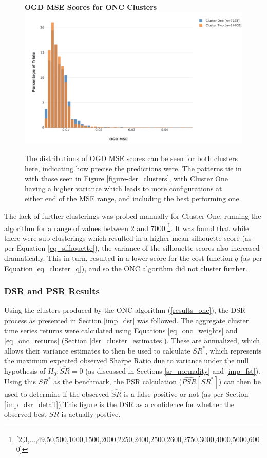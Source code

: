 \documentclass[a4paper,11pt,oneside]{article}
\theoremstyle{plain}
\theoremstyle{definition}
\begin{document}
	\begin{figure}[H]
		\centering
		\textbf{OGD MSE Scores for ONC Clusters}
		\includegraphics[scale=0.35]{images/results/dsr/cluster_distributions_mse.png} 
		\caption[OGD MSE Scores for ONC Clusters]{
			The distributions of OGD MSE scores can be seen for both clusters here, indicating how precise the predictions were. The patterns tie in with those seen in Figure \ref{figure-dsr_clusters}, with Cluster One having a higher variance which leads to more configurations at either end of the MSE range, and including the best performing one.}
		\label{figure-dsr_clusters_mse}
	\end{figure}
	
	The lack of further clusterings was probed manually for Cluster One, running the algorithm for a range of values between 2 and 7000 \footnote{[2,3,...,49,50,500,1000,1500,2000,2250,2400,2500,2600,2750,3000,4000,5000,6000]}. It was found that while there were sub-clusterings which resulted in a higher mean silhouette score (as per Equation \ref{eq_silhouette}), the variance of the silhouette scores also increased dramatically. This in turn, resulted in a lower score for the cost function $q$ (as per Equation \ref{eq_cluster_q}), and so the ONC algorithm did not cluster further.
	
	\subsubsection{DSR and PSR Results}\label{results_dsr2}
	
	Using the clusters produced by the ONC algorithm (\ref{results_onc}), the DSR process as presented in Section \ref{imp_dsr} was followed. The aggregate cluster time series returns were calculated using Equations \ref{eq_onc_weights} and \ref{eq_onc_returns} (Section \ref{dsr_cluster_estimates}). These are annualized, which allows their variance estimates to then be used to calculate $SR^*$, which represents the maximum expected observed Sharpe Ratio due to variance under the null hypothesis of $H_0:  \widehat{SR} = 0$ (as discussed in Sections \ref{sr_normality} and \ref{imp_fst}). Using this $SR^*$ as the benchmark, the PSR calculation ($\widehat{PSR}[SR^*]$) can then be used to determine if the observed $\widehat{SR}$ is a false positive or not (as per Section \ref{imp_dsr_detail}).This figure is the DSR as a confidence for whether the observed best $SR$ is actually postive. \newline
	
\end{document}
